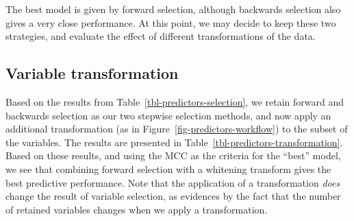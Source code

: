 \documentclass[
  letterpaper,
]{scrbook}
\begin{document}
The best model is given by forward selection, although backwards
selection also gives a very close performance. At this point, we may
decide to keep these two strategies, and evaluate the effect of
different transformations of the data.

\subsection{Variable transformation}\label{variable-transformation}

Based on the results from Table~\ref{tbl-predictors-selection}, we
retain forward and backwards selection as our two stepwise selection
methods, and now apply an additional transformation (as in
Figure~\ref{fig-predictors-workflow}) to the subset of the variables.
The results are presented in Table~\ref{tbl-predictors-transformation}.
Based on these results, and using the MCC as the criteria for the
``best'' model, we see that combining forward selection with a whitening
transform gives the best predictive performance. Note that the
application of a transformation \emph{does} change the result of
variable selection, as evidences by the fact that the number of retained
variables changes when we apply a transformation.
\end{document}

